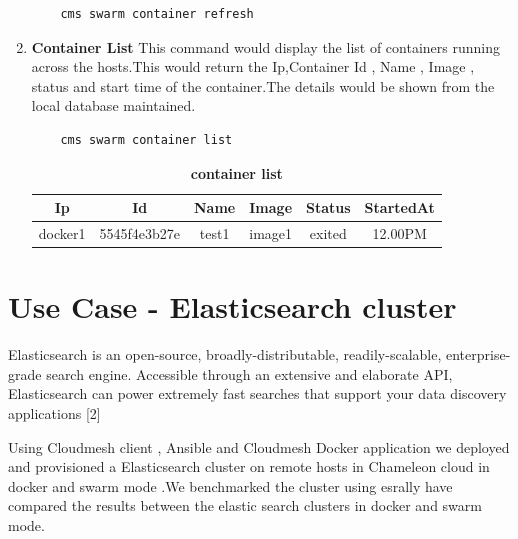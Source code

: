 \documentclass[9pt,twocolumn,twoside]{../../styles/osajnl}
\begin{document}
\begin{enumerate}
    \begin{verbatim}
    cms swarm container refresh
    \end{verbatim} 

    \item \textbf{Container List}
    This command would display the list of containers running across the hosts.This would return the Ip,Container Id , Name , Image , status and start time of the container.The details would be shown from the local database maintained.
    
    \begin{verbatim}
    cms swarm container list
    \end{verbatim} 
    
     \begin{table}[htbp]
     \caption{\bf container list }
     \begin{tabular}{cccccc}
     \hline
      Ip & Id & Name & Image &Status&StartedAt\\
      \hline
      docker1 & 5545f4e3b27e & test1 & image1 &exited & 12.00PM \\
     \hline
     \end{tabular}
     \label{tab:tab10}
     \end{table}
\end{enumerate}

\section{Use Case - Elasticsearch cluster }
 Elasticsearch\cite{www-ElasticSearch} is an open-source,
 broadly-distributable, readily-scalable, enterprise-grade search
 engine. Accessible through an extensive and elaborate API,
 Elasticsearch can power extremely fast searches that support your
 data discovery applications \cite{citemissing} [2]

 Using Cloudmesh  client , Ansible and Cloudmesh Docker application we deployed  and provisioned a Elasticsearch cluster on remote  hosts in Chameleon cloud in docker and swarm mode .We benchmarked the cluster using esrally\cite{www-ElasticSearchRally}  have compared  the  results between the elastic search clusters in docker and swarm mode.
 
 
\end{document}
